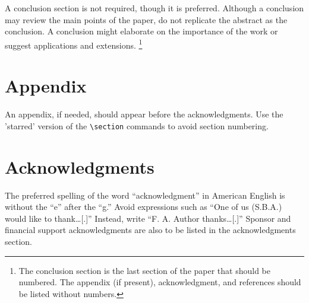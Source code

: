 A conclusion section is not required, though it is preferred.
Although a conclusion may review the main points of the paper, do not
replicate the abstract as the conclusion.
A conclusion might elaborate on the importance of the work or suggest
applications and extensions.%
\footnote{The conclusion section is the last section of
  the paper that should be numbered.
  The appendix (if present), acknowledgment, and references should be
  listed without numbers.}

\section*{Appendix}

An appendix, if needed, should appear before the acknowledgments.
Use the 'starred' version of the \verb|\section| commands to avoid
section numbering.

\section*{Acknowledgments}

The preferred spelling of the word ``acknowledgment'' in American
English is without the ``e'' after the ``g.''
Avoid expressions such as ``One of us (S.B.A.) would like to thank\ldots[.]''
Instead, write ``F. A. Author thanks\ldots[.]''
Sponsor and financial support acknowledgments are also to be listed in
the acknowledgments section.




